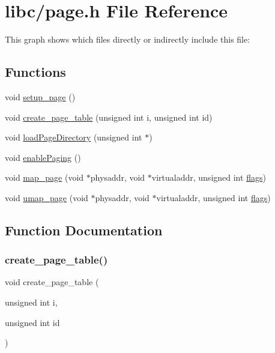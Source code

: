 \hypertarget{a00080}{}\section{libc/page.h File Reference}
\label{a00080}
This graph shows which files directly or indirectly include this file\+:
\subsection*{Functions}
\begin{DoxyCompactItemize}
\item 
void \hyperlink{a00080_a51f6a37816540dea572d38f2713e9f5a_a51f6a37816540dea572d38f2713e9f5a}{setup\+\_\+page} ()
\item 
void \hyperlink{a00080_a7bb2c9b4c69002e17903710ce4de395c_a7bb2c9b4c69002e17903710ce4de395c}{create\+\_\+page\+\_\+table} (unsigned int i, unsigned int id)
\item 
void \hyperlink{a00080_abfdf37b9c42cafa83b39f1a41264989c_abfdf37b9c42cafa83b39f1a41264989c}{load\+Page\+Directory} (unsigned int $\ast$)
\item 
void \hyperlink{a00080_a8fe3a9cca4b2ccd7a2743e9943880a32_a8fe3a9cca4b2ccd7a2743e9943880a32}{enable\+Paging} ()
\item 
void \hyperlink{a00080_adf8c9211327b122b455fabf292cc2411_adf8c9211327b122b455fabf292cc2411}{map\+\_\+page} (void $\ast$physaddr, void $\ast$virtualaddr, unsigned int \hyperlink{a00068_aa2585d779da0ab21273a8d92de9a0ebe_aa2585d779da0ab21273a8d92de9a0ebe}{flags})
\item 
void \hyperlink{a00080_a5a808805c707701e7fb8816d51896fb5_a5a808805c707701e7fb8816d51896fb5}{umap\+\_\+page} (void $\ast$physaddr, void $\ast$virtualaddr, unsigned int \hyperlink{a00068_aa2585d779da0ab21273a8d92de9a0ebe_aa2585d779da0ab21273a8d92de9a0ebe}{flags})
\end{DoxyCompactItemize}


\subsection{Function Documentation}
\mbox{\label{a00080_a7bb2c9b4c69002e17903710ce4de395c_a7bb2c9b4c69002e17903710ce4de395c}} 
\subsubsection{\texorpdfstring{create\+\_\+page\+\_\+table()}{create\_page\_table()}}
{\footnotesize\ttfamily void create\+\_\+page\+\_\+table (\begin{DoxyParamCaption}\item[{unsigned int}]{i,  }\item[{unsigned int}]{id }\end{DoxyParamCaption})}



